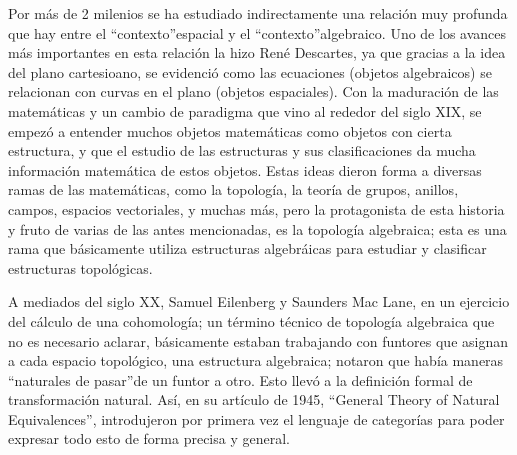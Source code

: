 \documentclass{comunicaciones}
\begin{document}
\noindent 

Por más de 2 milenios se ha estudiado indirectamente una relación muy profunda que hay entre el \textquotedblleft contexto\textquotedblright  espacial y el \textquotedblleft contexto\textquotedblright  algebraico. Uno de los avances más importantes en esta relación la hizo René Descartes, ya que gracias a la
idea del plano cartesioano, se evidenció como las ecuaciones (objetos algebraicos) se relacionan con curvas en el plano (objetos espaciales). Con la maduración de las matemáticas y un cambio de paradigma que vino al rededor del siglo XIX, se empezó a entender muchos objetos matemáticas como objetos con cierta estructura, y que el estudio de las estructuras y sus clasificaciones da mucha información matemática de estos objetos. Estas ideas dieron forma a diversas ramas de las matemáticas, como la topología, la teoría de grupos, anillos, campos, espacios vectoriales, y muchas más, pero la protagonista de esta historia y fruto de varias de las antes mencionadas, es la topología algebraica; esta es una rama que básicamente utiliza estructuras algebráicas para estudiar y clasificar estructuras topológicas. 

A mediados del siglo XX, Samuel Eilenberg y Saunders Mac Lane, en un ejercicio del cálculo de una cohomología; un término técnico de topología algebraica que no es necesario aclarar, básicamente estaban trabajando con funtores que asignan a cada espacio topológico, una estructura algebraica; notaron que había maneras \textquotedblleft naturales de pasar\textquotedblright  de un funtor a otro. Esto llevó a la definición formal de transformación natural. Así, en su artículo de 1945, “General Theory of Natural Equivalences”, introdujeron por primera vez el lenguaje de categorías para poder expresar todo esto de forma precisa y general.
\end{document}
